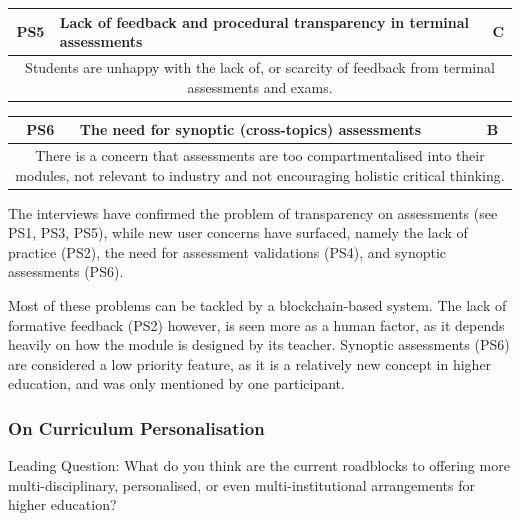 \begin{table}[!ht]
	\begin{tabularx}{\textwidth}{|c|X|c|}
		\hline
		PS5 & \textbf{Lack of feedback and procedural transparency in terminal assessments} & C \\
		\hline
		\multicolumn{3}{|X|}{Students are unhappy with the lack of, or scarcity of feedback
			from terminal assessments and exams.}                                                   \\
		\hline
	\end{tabularx}
\end{table}
\begin{table}[!ht]
	\begin{tabularx}{\textwidth}{|c|X|c|}
		\hline
		PS6 & \textbf{The need for synoptic (cross-topics) assessments} & B \\
		\hline
		\multicolumn{3}{|X|}{There is a concern that assessments are too
			compartmentalised into their modules, not relevant to industry and not encouraging
			holistic critical thinking.}                                       \\
		\hline
	\end{tabularx}
\end{table}

The interviews have confirmed the problem of transparency on assessments (see PS1, PS3, PS5), 
while new user concerns have surfaced, namely the lack of practice (PS2), the need 
for assessment validations (PS4), and synoptic assessments (PS6).

Most of these problems can be tackled by a blockchain-based system. 
The lack of formative feedback (PS2) however, is seen more as a human factor, 
as it depends heavily on how the module is designed by its teacher. 
Synoptic assessments (PS6) are considered a low priority feature, 
as it is a relatively new concept in higher education, and was only mentioned by 
one participant.

\subsubsection{On Curriculum Personalisation}

Leading Question: What do you think are the current roadblocks to offering more multi-disciplinary,
personalised, or even multi-institutional arrangements for higher education?


